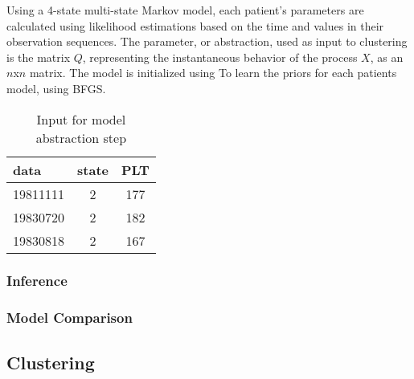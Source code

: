 Using a 4-state multi-state Markov model, each patient's parameters are calculated using likelihood estimations based on the time and values in their observation sequences.  The parameter, or abstraction, used as input to clustering is the matrix $Q$, representing the instantaneous behavior of the process $X$, as an $n$x$n$ matrix.
The model is initialized using To learn the priors for each patients model, using BFGS.




\begin{table}[ht]
\caption{Input for model abstraction step}
\label{hepinput}
\vskip 0.3in
\begin{center}
\begin{tabular}{lcc}
\hline
data& state	& PLT	\\
\hline
19811111& 2&177 \\
19830720&2&182 \\
19830818&2&167 \\
\hline
\end{tabular}
\end{center}
\vskip -0.1in
\end{table}



\subsubsection{Inference}
\subsubsection{Model Comparison}
\subsection{Clustering}

